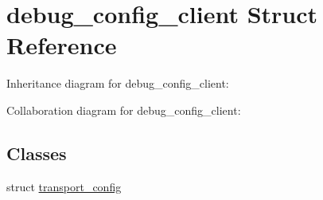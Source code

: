 \hypertarget{structdebug__config__client}{}\section{debug\+\_\+config\+\_\+client Struct Reference}
\label{structdebug__config__client}


Inheritance diagram for debug\+\_\+config\+\_\+client\+:


Collaboration diagram for debug\+\_\+config\+\_\+client\+:
\subsection*{Classes}
\begin{DoxyCompactItemize}
\item 
struct \mbox{\hyperlink{structdebug__config__client_1_1transport__config}{transport\+\_\+config}}
\end{DoxyCompactItemize}
